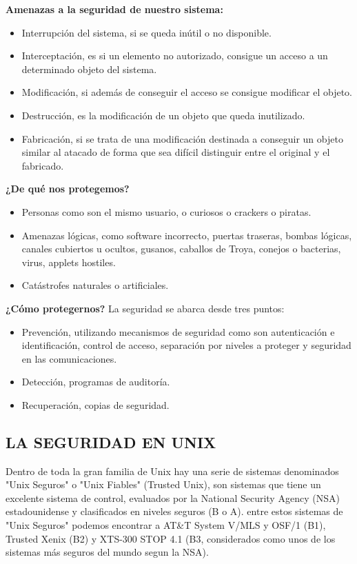 \textbf{Amenazas a  la seguridad de nuestro sistema:} 

\begin{itemize}
	\item	Interrupción del  sistema, si se queda inútil o  no disponible.
	\item Interceptación, es si un elemento no autorizado, consigue un acceso a un determinado objeto del sistema.
	\item Modificación, si además de conseguir el acceso se consigue modificar el objeto.
	\item Destrucción, es la modificación de un objeto que queda inutilizado.
	\item Fabricación, si se trata de una modificación destinada a conseguir un objeto similar al atacado de forma que sea difícil distinguir entre el original y el fabricado.
\end{itemize}

\textbf{¿De qué nos protegemos?}

\begin{itemize}
	\item Personas como son el mismo usuario, o curiosos o crackers o piratas.
	\item Amenazas lógicas, como software incorrecto, puertas traseras, bombas lógicas, canales cubiertos u ocultos, gusanos, caballos de Troya, conejos o bacterias, virus, 		
			applets hostiles.
	\item Catástrofes naturales o artificiales. 
\end{itemize}

\textbf{¿Cómo protegernos?}
La seguridad se abarca desde tres puntos:
\begin{itemize}
	\item Prevención, utilizando mecanismos de seguridad como son autenticación e identificación, control de acceso, separación por niveles a proteger y seguridad en las 
			comunicaciones.
	\item Detección, programas de auditoría.
	\item Recuperación, copias de seguridad.
\end{itemize}

\subsection*{LA SEGURIDAD  EN  UNIX}
Dentro  de  toda  la gran familia de Unix  hay  una  serie de sistemas denominados "Unix Seguros"  o "Unix Fiables" (Trusted Unix), son sistemas  que  tiene  un excelente sistema 
de control, evaluados  por la National Security Agency (NSA) estadounidense y clasificados en niveles seguros (B o A). entre estos sistemas  de  "Unix  Seguros" podemos  
encontrar  a  AT\&T System V/MLS  y  OSF/1 (B1), Trusted Xenix (B2) y  XTS-300 STOP 4.1 (B3, considerados como unos de los  sistemas  más  seguros  del  mundo segun  la  NSA).
 
